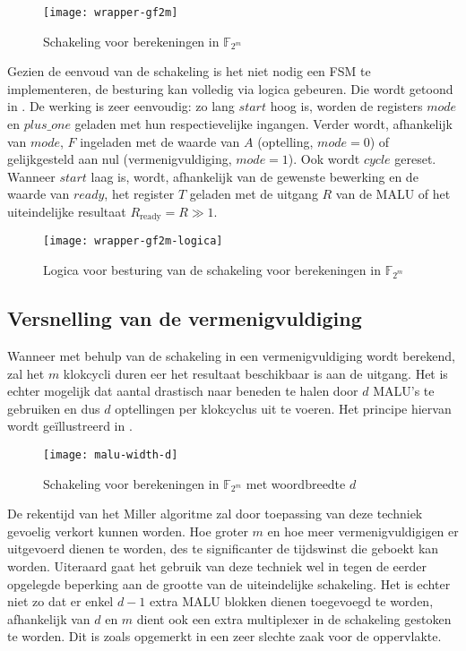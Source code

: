 \begin{figure}[h]
	\centering
		\texttt{[image: wrapper-gf2m]}
		\caption{Schakeling voor berekeningen in $\mathbb{F}_{2^m}$\label{figuur-implementatie-wrapper-gf2m}}
\end{figure}

Gezien de eenvoud van de schakeling is het niet nodig een FSM te implementeren, de besturing kan volledig via logica gebeuren. Die wordt getoond in . De werking is zeer eenvoudig: zo lang $start$ hoog is, worden de registers $mode$ en $plus\_one$ geladen met hun respectievelijke ingangen. Verder wordt, afhankelijk van $mode$, $F$ ingeladen met de waarde van $A$ (optelling, $mode = 0$) of gelijkgesteld aan nul (vermenigvuldiging, $mode = 1$). Ook wordt $cycle$ gereset. Wanneer $start$ laag is, wordt, afhankelijk van de gewenste bewerking en de waarde van $ready$, het register $T$ geladen met de uitgang $R$ van de MALU of het uiteindelijke resultaat $R_{\text{ready}} = R \gg 1$.

\begin{figure}[h]
	\centering
		\texttt{[image: wrapper-gf2m-logica]}
		\caption{Logica voor besturing van de schakeling voor berekeningen in $\mathbb{F}_{2^m}$\label{figuur-implementatie-wrapper-gf2m-logica}}
\end{figure}

\subsection{Versnelling van de vermenigvuldiging\label{subsectie-implementatie-gf2m-versnelling}}

Wanneer met behulp van de schakeling in  een vermenigvuldiging wordt berekend, zal het $m$ klokcycli duren eer het resultaat beschikbaar is aan de uitgang. Het is echter mogelijk dat aantal drastisch naar beneden te halen door $d$ MALU's te gebruiken en dus $d$ optellingen per klokcyclus uit te voeren. Het principe hiervan wordt ge\"illustreerd in .

\begin{figure}[h]
	\centering
		\texttt{[image: malu-width-d]}
		\caption{Schakeling voor berekeningen in $\mathbb{F}_{2^m}$ met woordbreedte $d$\label{figuur-implementatie-wrapper-gf2m-d}}
\end{figure}

De rekentijd van het Miller algoritme zal door toepassing van deze techniek gevoelig verkort kunnen worden. Hoe groter $m$ en hoe meer vermenigvuldigigen er uitgevoerd dienen te worden, des te significanter de tijdswinst die geboekt kan worden. Uiteraard gaat het gebruik van deze techniek wel in tegen de eerder opgelegde beperking aan de grootte van de uiteindelijke schakeling. Het is echter niet zo dat er enkel $d - 1$ extra MALU blokken dienen toegevoegd te worden, afhankelijk van $d$ en $m$ dient ook een extra multiplexer in de schakeling gestoken te worden. Dit is zoals opgemerkt in  een zeer slechte zaak voor de  oppervlakte.

